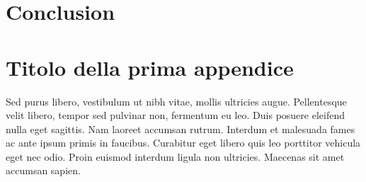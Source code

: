 \documentclass[target=bach,aauheader=,style=]{thud}
\begin{document}
\chapter{Conclusion}
\appendix


\chapter{Titolo della prima appendice}
Sed purus libero, vestibulum ut nibh vitae, mollis ultricies augue. Pellentesque velit libero, tempor sed pulvinar non, fermentum eu leo. Duis posuere eleifend nulla eget sagittis. Nam laoreet accumsan rutrum. Interdum et malesuada fames ac ante ipsum primis in faucibus. Curabitur eget libero quis leo porttitor vehicula eget nec odio. Proin euismod interdum ligula non ultricies. Maecenas sit amet accumsan sapien.

\backmatter



\end{document}
